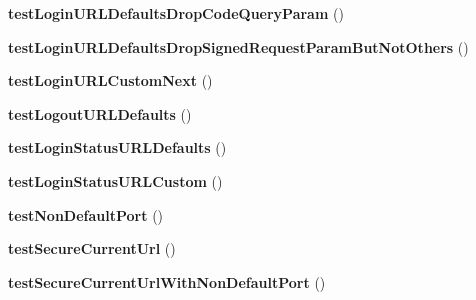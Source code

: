 \begin{DoxyCompactItemize}
\item 
\hypertarget{class_p_h_p_s_d_k_test_case_ae6dd58c1019b0ead8a091715ec857ee4}{{\bfseries test\-Login\-U\-R\-L\-Defaults\-Drop\-Code\-Query\-Param} ()}\label{class_p_h_p_s_d_k_test_case_ae6dd58c1019b0ead8a091715ec857ee4}

\item 
\hypertarget{class_p_h_p_s_d_k_test_case_a09e4fbb58784995be8d2d56afe26c556}{{\bfseries test\-Login\-U\-R\-L\-Defaults\-Drop\-Signed\-Request\-Param\-But\-Not\-Others} ()}\label{class_p_h_p_s_d_k_test_case_a09e4fbb58784995be8d2d56afe26c556}

\item 
\hypertarget{class_p_h_p_s_d_k_test_case_a91811985addad397dac81b5c0e1a8fa6}{{\bfseries test\-Login\-U\-R\-L\-Custom\-Next} ()}\label{class_p_h_p_s_d_k_test_case_a91811985addad397dac81b5c0e1a8fa6}

\item 
\hypertarget{class_p_h_p_s_d_k_test_case_a6d85be49a802e51eee6d999faf87398c}{{\bfseries test\-Logout\-U\-R\-L\-Defaults} ()}\label{class_p_h_p_s_d_k_test_case_a6d85be49a802e51eee6d999faf87398c}

\item 
\hypertarget{class_p_h_p_s_d_k_test_case_ad472d9772812733fe44ddf1d8fa1e34b}{{\bfseries test\-Login\-Status\-U\-R\-L\-Defaults} ()}\label{class_p_h_p_s_d_k_test_case_ad472d9772812733fe44ddf1d8fa1e34b}

\item 
\hypertarget{class_p_h_p_s_d_k_test_case_a4e959e6a006be1409f60531456a2ccd4}{{\bfseries test\-Login\-Status\-U\-R\-L\-Custom} ()}\label{class_p_h_p_s_d_k_test_case_a4e959e6a006be1409f60531456a2ccd4}

\item 
\hypertarget{class_p_h_p_s_d_k_test_case_a3154173c47d9168e2f9a7a98f9a3d7e8}{{\bfseries test\-Non\-Default\-Port} ()}\label{class_p_h_p_s_d_k_test_case_a3154173c47d9168e2f9a7a98f9a3d7e8}

\item 
\hypertarget{class_p_h_p_s_d_k_test_case_ad1749069fc83541eab8e13436ddc04b0}{{\bfseries test\-Secure\-Current\-Url} ()}\label{class_p_h_p_s_d_k_test_case_ad1749069fc83541eab8e13436ddc04b0}

\item 
\hypertarget{class_p_h_p_s_d_k_test_case_af21c5703f8716131d3ae6aa863a51c11}{{\bfseries test\-Secure\-Current\-Url\-With\-Non\-Default\-Port} ()}\label{class_p_h_p_s_d_k_test_case_af21c5703f8716131d3ae6aa863a51c11}


\end{DoxyCompactItemize}
